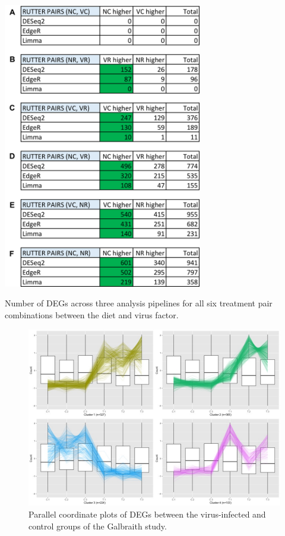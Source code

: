 \documentclass[11pt,a4paper,oldfontcommands,openany]{memoir}
\numberwithin{equation}{section} %
\begin{document}
\begin{table}[H]
  \includegraphics[width=0.65\textwidth]{Images/pairDEGs}
  \caption{Number of DEGs across three analysis pipelines for all six treatment pair combinations between the diet and virus factor.}
  \label{tbl:pairDEGs}
\end{table}

\begin{figure}[H]
\centering
  \includegraphics[width=\textwidth]{../VirusHoneyBee/DESeq2/ClusterStandard/Clustering_data_FDR_05/C_T_4.jpg}
  \caption{Parallel coordinate plots of DEGs between the virus-infected and control groups of the Galbraith study.}
  \label{fig:pcpGalbraith}
\end{figure}
\end{document}
